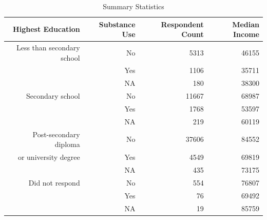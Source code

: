 \documentclass[11pt]{article}
\newcommand\T{\rule{0pt}{2.6ex}}       %
\begin{document}
{
\begin{table}[!htbp]
\caption{Summary Statistics}
\centering
\def\sym#1{\ifmmode^{#1}\else\(^{#1}\)\fi}
\begin{tabular}{rrrr}
  \hline
   Highest Education & Substance Use & Respondent Count & Median Income \\
  \hline
  \T
   Less than secondary school &                   No & 5313 & 46155 \\
   &                                              Yes & 1106 & 35711 \\
   &                                              NA & 180 & 38300\\
   \midrule
   Secondary school &                             No & 11667 & 68987 \\
   &                                              Yes & 1768 & 53597 \\
   &                                              NA &  219 & 60119 \\
   \midrule
   Post-secondary diploma &                       No & 37606 & 84552 \\
   or university degree&                          Yes & 4549 & 69819 \\
   &                                              NA &  435 & 73175 \\
   \midrule
   Did not respond &                              No & 554 & 76807 \\
    &                                             Yes & 76 & 69492 \\
    &                                             NA & 19 & 85759 \\
   \hline
\end{tabular}
\end{table}
}
\end{document}
